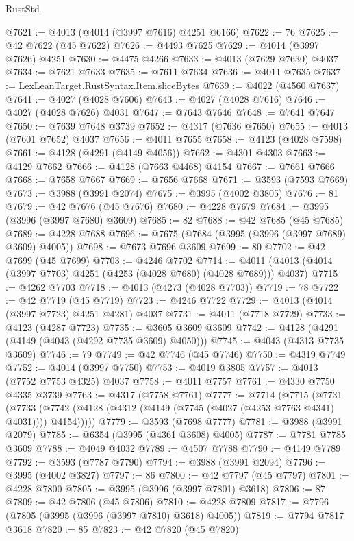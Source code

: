 \begin{lexlean}{RustStd}
\begin{coremodule}
@7621 := @4013 (@4014 (@3997 @7616) @4251 @6166)
@7622 := 76
@7625 := @42 @7622 (@45 @7622)
@7626 := @4493 @7625
@7629 := @4014 (@3997 @7626) @4251
@7630 := @4475 @4266
@7633 := @4013 (@7629 @7630) @4037
@7634 := @7621 @7633
@7635 := @7611 @7634
@7636 := @4011 @7635
@7637 := LexLeanTarget.RustSyntax.Item.sliceBytes
@7639 := @4022 (@4560 @7637)
@7641 := @4027 (@4028 @7606)
@7643 := @4027 (@4028 @7616)
@7646 := @4027 (@4028 @7626) @4031
@7647 := @7643 @7646
@7648 := @7641 @7647
@7650 := @7639 @7648 @3739
@7652 := @4317 (@7636 @7650)
@7655 := @4013 (@7601 @7652) @4037
@7656 := @4011 @7655
@7658 := @4123 (@4028 @7598)
@7661 := @4128 (@4291 (@4149 @4056))
@7662 := @4301 @4303
@7663 := @4129 @7662
@7666 := @4128 (@7663 @4468) @4154
@7667 := @7661 @7666
@7668 := @7658 @7667
@7669 := @7656 @7668
@7671 := @3593 (@7593 @7669)
@7673 := @3988 (@3991 @2074)
@7675 := @3995 (@4002 @3805)
@7676 := 81
@7679 := @42 @7676 (@45 @7676)
@7680 := @4228 @7679
@7684 := @3995 (@3996 (@3997 @7680) @3609)
@7685 := 82
@7688 := @42 @7685 (@45 @7685)
@7689 := @4228 @7688
@7696 := @7675 (@7684 (@3995 (@3996 (@3997 @7689) @3609) @4005))
@7698 := @7673 @7696 @3609
@7699 := 80
@7702 := @42 @7699 (@45 @7699)
@7703 := @4246 @7702
@7714 := @4011 (@4013 (@4014 (@3997 @7703) @4251 (@4253 (@4028 @7680) (@4028 @7689))) @4037)
@7715 := @4262 @7703
@7718 := @4013 (@4273 (@4028 @7703))
@7719 := 78
@7722 := @42 @7719 (@45 @7719)
@7723 := @4246 @7722
@7729 := @4013 (@4014 (@3997 @7723) @4251 @4281) @4037
@7731 := @4011 (@7718 @7729)
@7733 := @4123 (@4287 @7723)
@7735 := @3605 @3609 @3609
@7742 := @4128 (@4291 (@4149 (@4043 (@4292 @7735 @3609) @4050)))
@7745 := @4043 (@4313 @7735 @3609)
@7746 := 79
@7749 := @42 @7746 (@45 @7746)
@7750 := @4319 @7749
@7752 := @4014 (@3997 @7750)
@7753 := @4019 @3805
@7757 := @4013 (@7752 @7753 @4325) @4037
@7758 := @4011 @7757
@7761 := @4330 @7750 @4335 @3739
@7763 := @4317 (@7758 @7761)
@7777 := @7714
    (@7715
      (@7731
        (@7733 (@7742 (@4128 (@4312 (@4149 (@7745 (@4027 (@4253 @7763 @4341) @4031)))) @4154)))))
@7779 := @3593 (@7698 @7777)
@7781 := @3988 (@3991 @2079)
@7785 := @6354 (@3995 (@4361 @3608) @4005)
@7787 := @7781 @7785 @3609
@7788 := @4049 @4032
@7789 := @4507 @7788
@7790 := @4149 @7789
@7792 := @3593 (@7787 @7790)
@7794 := @3988 (@3991 @2094)
@7796 := @3995 (@4002 @3827)
@7797 := 86
@7800 := @42 @7797 (@45 @7797)
@7801 := @4228 @7800
@7805 := @3995 (@3996 (@3997 @7801) @3618)
@7806 := 87
@7809 := @42 @7806 (@45 @7806)
@7810 := @4228 @7809
@7817 := @7796 (@7805 (@3995 (@3996 (@3997 @7810) @3618) @4005))
@7819 := @7794 @7817 @3618
@7820 := 85
@7823 := @42 @7820 (@45 @7820)

\end{coremodule}
\end{lexlean}
